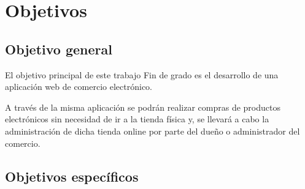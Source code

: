 \documentclass[a4paper, 12pt]{book}
\begin{document}

\cleardoublepage %
\chapter{Objetivos} %
\label{chap:objetivos} %

\section{Objetivo general} %
\label{sec:objetivo-general} %

El objetivo principal de este trabajo Fin de grado es el desarrollo de una aplicación web de comercio electrónico.

A través de la misma aplicación se podrán realizar compras de productos electrónicos sin necesidad de ir a la tienda física y, se llevará a cabo la administración de dicha tienda online por parte del dueño o administrador del comercio.  


\section{Objetivos específicos}
\label{sec:objetivos-especificos}
\end{document}
